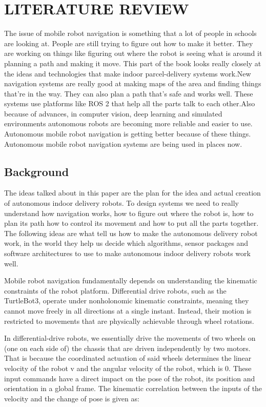 \chapter{LITERATURE REVIEW}
The issue of mobile robot navigation is something that a lot of people in schools are looking at. People are still trying to figure out how to make it better. They are working on things like figuring out where the robot is seeing what is around it planning a path and making it move. This part of the book looks really closely at the ideas and technologies that make indoor parcel-delivery systems work.New navigation systems are really good at making maps of the area and finding things that're in the way. They can also plan a path that's safe and works well. These systems use platforms like ROS 2 that help all the parts talk to each other.Also because of advances, in computer vision, deep learning and simulated environments autonomous robots are becoming more reliable and easier to use. Autonomous mobile robot navigation is getting better because of these things. Autonomous mobile robot navigation systems are being used in places now.
\section{Background}


The ideas talked about in this paper are the plan for the idea and actual creation of autonomous indoor delivery robots. To design systems we need to really understand how navigation works, how to figure out where the robot is, how to plan its path how to control its movement and how to put all the parts together. The following ideas are what tell us how to make the autonomous delivery robot work, in the world they help us decide which algorithms, sensor packages and software architectures to use to make autonomous indoor delivery robots work well.

Mobile robot navigation fundamentally depends on understanding the kinematic constraints of the robot platform. Differential drive robots, such as the TurtleBot3, operate under nonholonomic kinematic constraints, meaning they cannot move freely in all directions at a single instant. Instead, their motion is restricted to movements that are physically achievable through wheel rotations.

In differential-drive robots, we essentially drive the movements of two wheels on (one on each side of) the chassis that are driven independently by two motors. That is because the coordinated actuation of said wheels determines the linear velocity of the robot v and the angular velocity of the robot, which is 0. These input commands have a direct impact on the pose of the robot, its position and orientation in a global frame. The kinematic correlation between the inputs of the velocity and the change of pose is given as:

